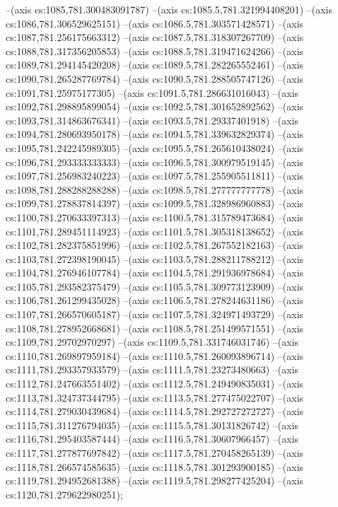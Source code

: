 --(axis cs:1085,781.300483091787)
--(axis cs:1085.5,781.321994408201)
--(axis cs:1086,781.306529625151)
--(axis cs:1086.5,781.303571428571)
--(axis cs:1087,781.256175663312)
--(axis cs:1087.5,781.318307267709)
--(axis cs:1088,781.317356205853)
--(axis cs:1088.5,781.319471624266)
--(axis cs:1089,781.294145420208)
--(axis cs:1089.5,781.282265552461)
--(axis cs:1090,781.265287769784)
--(axis cs:1090.5,781.288505747126)
--(axis cs:1091,781.25975177305)
--(axis cs:1091.5,781.286631016043)
--(axis cs:1092,781.298895899054)
--(axis cs:1092.5,781.301652892562)
--(axis cs:1093,781.314863676341)
--(axis cs:1093.5,781.29337401918)
--(axis cs:1094,781.280693950178)
--(axis cs:1094.5,781.339632829374)
--(axis cs:1095,781.242245989305)
--(axis cs:1095.5,781.265610438024)
--(axis cs:1096,781.293333333333)
--(axis cs:1096.5,781.300979519145)
--(axis cs:1097,781.256983240223)
--(axis cs:1097.5,781.255905511811)
--(axis cs:1098,781.288288288288)
--(axis cs:1098.5,781.277777777778)
--(axis cs:1099,781.278837814397)
--(axis cs:1099.5,781.328986960883)
--(axis cs:1100,781.270633397313)
--(axis cs:1100.5,781.315789473684)
--(axis cs:1101,781.289451114923)
--(axis cs:1101.5,781.305318138652)
--(axis cs:1102,781.282375851996)
--(axis cs:1102.5,781.267552182163)
--(axis cs:1103,781.272398190045)
--(axis cs:1103.5,781.288211788212)
--(axis cs:1104,781.276946107784)
--(axis cs:1104.5,781.291936978684)
--(axis cs:1105,781.293582375479)
--(axis cs:1105.5,781.309773123909)
--(axis cs:1106,781.261299435028)
--(axis cs:1106.5,781.278244631186)
--(axis cs:1107,781.266570605187)
--(axis cs:1107.5,781.324971493729)
--(axis cs:1108,781.278952668681)
--(axis cs:1108.5,781.251499571551)
--(axis cs:1109,781.29702970297)
--(axis cs:1109.5,781.331746031746)
--(axis cs:1110,781.269897959184)
--(axis cs:1110.5,781.260093896714)
--(axis cs:1111,781.293357933579)
--(axis cs:1111.5,781.23273480663)
--(axis cs:1112,781.247663551402)
--(axis cs:1112.5,781.249490835031)
--(axis cs:1113,781.324737344795)
--(axis cs:1113.5,781.277475022707)
--(axis cs:1114,781.279030439684)
--(axis cs:1114.5,781.292727272727)
--(axis cs:1115,781.311276794035)
--(axis cs:1115.5,781.30131826742)
--(axis cs:1116,781.295403587444)
--(axis cs:1116.5,781.30607966457)
--(axis cs:1117,781.277877697842)
--(axis cs:1117.5,781.270458265139)
--(axis cs:1118,781.266574585635)
--(axis cs:1118.5,781.301293900185)
--(axis cs:1119,781.294952681388)
--(axis cs:1119.5,781.298277425204)
--(axis cs:1120,781.279622980251);

